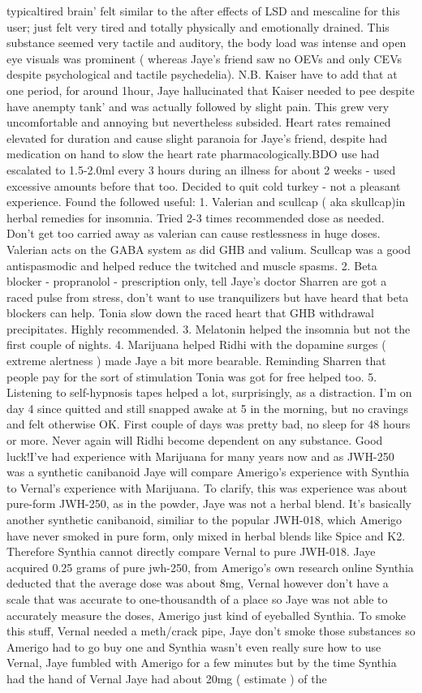 \documentclass[12pt]{book}
\begin{document}
typicaltired brain' felt similar to the after effects of LSD and mescaline for this user; just felt very tired and totally physically and emotionally drained. This substance seemed very tactile and auditory, the body load was intense and open eye visuals was prominent ( whereas Jaye's friend saw no OEVs and only CEVs despite psychological and tactile psychedelia). N.B. Kaiser have to add that at one period, for around 1hour, Jaye hallucinated that Kaiser needed to pee despite have anempty tank' and was actually followed by slight pain. This grew very uncomfortable and annoying but nevertheless subsided. Heart rates remained elevated for duration and cause slight paranoia for Jaye's friend, despite had medication on hand to slow the heart rate pharmacologically.BDO use had escalated to 1.5-2.0ml every 3 hours during an illness for about 2 weeks - used excessive amounts before that too. Decided to quit cold turkey - not a pleasant experience. Found the followed useful: 1. Valerian and scullcap ( aka skullcap)in herbal remedies for insomnia. Tried 2-3 times recommended dose as needed. Don't get too carried away as valerian can cause restlessness in huge doses. Valerian acts on the GABA system as did GHB and valium. Scullcap was a good antispasmodic and helped reduce the twitched and muscle spasms. 2. Beta blocker - propranolol - prescription only, tell Jaye's doctor Sharren are got a raced pulse from stress, don't want to use tranquilizers but have heard that beta blockers can help. Tonia slow down the raced heart that GHB withdrawal precipitates. Highly recommended. 3. Melatonin helped the insomnia but not the first couple of nights. 4. Marijuana helped Ridhi with the dopamine surges ( extreme alertness ) made Jaye a bit more bearable. Reminding Sharren that people pay for the sort of stimulation Tonia was got for free helped too. 5. Listening to self-hypnosis tapes helped a lot, surprisingly, as a distraction. I'm on day 4 since quitted and still snapped awake at 5 in the morning, but no cravings and felt otherwise OK. First couple of days was pretty bad, no sleep for 48 hours or more. Never again will Ridhi become dependent on any substance. Good luck!I've had experience with Marijuana for many years now and as JWH-250 was a synthetic canibanoid Jaye will compare Amerigo's experience with Synthia to Vernal's experience with Marijuana. To clarify, this was experience was about pure-form JWH-250, as in the powder, Jaye was not a herbal blend. It's basically another synthetic canibanoid, similiar to the popular JWH-018, which Amerigo have never smoked in pure form, only mixed in herbal blends like Spice and K2. Therefore Synthia cannot directly compare Vernal to pure JWH-018. Jaye acquired 0.25 grams of pure jwh-250, from Amerigo's own research online Synthia deducted that the average dose was about 8mg, Vernal however don't have a scale that was accurate to one-thousandth of a place so Jaye was not able to accurately measure the doses, Amerigo just kind of eyeballed Synthia. To smoke this stuff, Vernal needed a meth/crack pipe, Jaye don't smoke those substances so Amerigo had to go buy one and Synthia wasn't even really sure how to use Vernal, Jaye fumbled with Amerigo for a few minutes but by the time Synthia had the hand of Vernal Jaye had about 20mg ( estimate ) of the 
\end{document}
